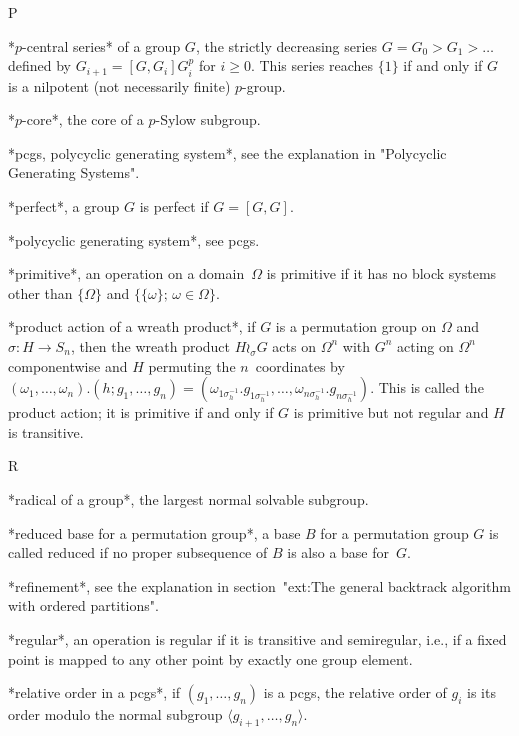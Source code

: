 P

*$p$-central series* of a group $G$, the strictly  decreasing series $G =
G_0 > G_1 > \ldots$ defined by $G_{i+1} = [G,G_i]G_i^p$ for $i\ge0$. This
series reaches $\{1\}$ if and only if $G$ is a nilpotent (not necessarily
finite) $p$-group.

*$p$-core*, the core of a $p$-Sylow subgroup.

*pcgs, polycyclic generating  system*, see the explanation in "Polycyclic
Generating Systems".

*perfect*, a group $G$ is perfect if $G=[G,G]$.

*polycyclic generating system*, see pcgs.

*primitive*, an operation on a domain~$\Omega$ is primitive  if it has no
block  systems other  than   $\{\Omega\}$  and  $\{\{\omega\};\,\omega\in
\Omega\}$.

*product  action of a wreath  product*, if $G$  is a permutation group on
$\Omega$  and    $\sigma\colon H\to    S_n$,   then  the  wreath  product
$H\wr_\sigma G$ acts   on  $\Omega^n$ with  $G^n$  acting on   $\Omega^n$
componentwise     and      $H$  permuting     the    $n$~coordinates   by
$(\omega_1,\ldots,\omega_n).               (h;g_1,\ldots,g_n)           =
(\omega_{1\sigma_h^{-1}}.             g_{1\sigma_h^{-1}},         \ldots,
\omega_{n\sigma_h^{-1}}. g_{n\sigma_h^{-1}})$. This is called the product
action; it is primitive if  and only if  $G$ is primitive but not regular
and $H$ is transitive.

 R

*radical of a group*, the largest normal solvable subgroup.

*reduced  base  for a permutation group*,  a  base  $B$ for a permutation
group  $G$ is called reduced  if no proper subsequence of  $B$  is also a
base for~$G$.

*refinement*, see the explanation in section~"ext:The general backtrack
algorithm with ordered partitions".

*regular*, an  operation is regular if  it is transitive and semiregular,
i.e., if a fixed point is mapped to any other point  by exactly one group
element.

*relative order in a pcgs*, if $(g_1,\ldots,g_n)$ is a pcgs, the relative
order    of $g_i$   is   its    order     modulo the  normal     subgroup
$\langle g_{i+1},\ldots,g_n\rangle$.

